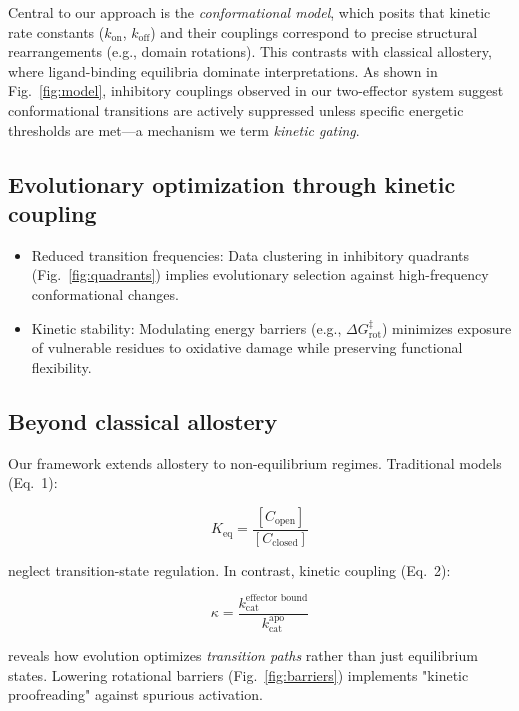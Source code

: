 \documentclass[pdflatex,sn-mathphys-num]{sn-jnl}%
\theoremstyle{thmstyleone}%
\theoremstyle{thmstyletwo}%
\theoremstyle{thmstylethree}%
\begin{document}
Central to our approach is the \textit{conformational model}, which posits that kinetic rate constants ($k_{\text{on}}$, $k_{\text{off}}$) and their couplings correspond to precise structural rearrangements (e.g., domain rotations). This contrasts with classical allostery, where ligand-binding equilibria dominate interpretations. As shown in Fig.~\ref{fig:model}, inhibitory couplings observed in our two-effector system suggest conformational transitions are actively suppressed unless specific energetic thresholds are met—a mechanism we term \textit{kinetic gating}.

\subsection*{Evolutionary optimization through kinetic coupling}
\begin{itemize}
	\item Reduced transition frequencies: Data clustering in inhibitory quadrants (Fig.~\ref{fig:quadrants}) implies evolutionary selection against high-frequency conformational changes. 
	\item Kinetic stability: Modulating energy barriers (e.g., $\Delta G^{\ddagger}_{\text{rot}}$) minimizes exposure of vulnerable residues to oxidative damage while preserving functional flexibility.
\end{itemize}

\subsection*{Beyond classical allostery}
Our framework extends allostery to non-equilibrium regimes. Traditional models (Eq.~1):

\begin{equation}
	K_{\text{eq}} = \frac{[C_{\text{open}}]}{[C_{\text{closed}}]}
\end{equation}

neglect transition-state regulation. In contrast, kinetic coupling (Eq.~2):

\begin{equation}
	\kappa = \frac{k_{\text{cat}}^{\text{effector\ bound}}}{k_{\text{cat}}^{\text{apo}}}
\end{equation}

reveals how evolution optimizes \textit{transition paths} rather than just equilibrium states. Lowering rotational barriers (Fig.~\ref{fig:barriers}) implements "kinetic proofreading" against spurious activation.
\end{document}
